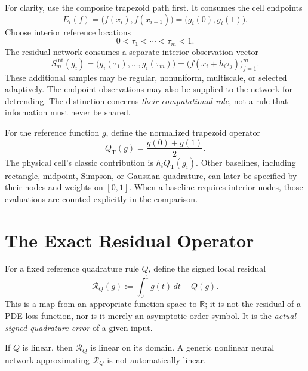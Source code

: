 For clarity, use the composite trapezoid path first. It consumes the cell
endpoints
\begin{equation}
    E_i(f)=\bigl(f(x_i),f(x_{i+1})\bigr)
    =\bigl(g_i(0),g_i(1)\bigr).
\end{equation}
Choose interior reference locations
\[
    0<\tau_1<\cdots<\tau_m<1.
\]
The residual network consumes a separate interior observation vector
\begin{equation}
    S^{\mathrm{int}}_m(g_i)
    =\bigl(g_i(\tau_1),\ldots,g_i(\tau_m)\bigr)
    =\bigl(f(x_i+h_i\tau_j)\bigr)_{j=1}^{m}.
    \label{eq:resop-interior-sampling}
\end{equation}
These additional samples may be regular, nonuniform, multiscale, or selected
adaptively. The endpoint observations may also be supplied to the network
for detrending. The distinction concerns \emph{their computational role}, not
a rule that information must never be shared.

For the reference function $g$, define the normalized trapezoid operator
\begin{equation}
    Q_{\mathrm T}(g)=\frac{g(0)+g(1)}{2}.
    \label{eq:resop-trapezoid}
\end{equation}
The physical cell's classic contribution is $h_iQ_{\mathrm T}(g_i)$.
Other baselines, including rectangle, midpoint, Simpson, or Gaussian
quadrature, can later be specified by their nodes and weights on $[0,1]$.
When a baseline requires interior nodes, those evaluations are counted
explicitly in the comparison.

\section{The Exact Residual Operator}
\label{sec:resop-exact}

For a fixed reference quadrature rule $Q$, define the signed local residual
\begin{equation}
    \boxed{
        \mathcal R_Q(g)
        :=\int_0^1g(t)\,dt-Q(g).
    }
    \label{eq:resop-exact-residual}
\end{equation}
This is a map from an appropriate function space to $\mathbb R$; it is not
the residual of a PDE loss function, nor is it merely an asymptotic order
symbol. It is the \emph{actual signed quadrature error} of a given input.

If $Q$ is linear, then $\mathcal R_Q$ is linear on its domain. A generic
nonlinear neural network approximating $\mathcal R_Q$ is not automatically
linear.

